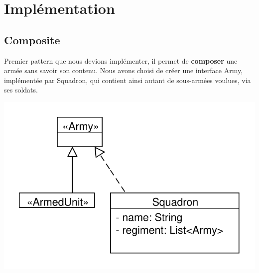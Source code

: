 ﻿\documentclass[12pt]{article}
\begin{document}
\newpage
\section{Implémentation}
\subsection{Composite}
Premier pattern que nous devions implémenter, il permet de \textbf{composer} une armée sans savoir son contenu.
Nous avons choisi de créer une interface Army, implémentée par Squadron, qui contient ainsi autant de sous-armées voulues, via ses soldats.

\includegraphics[scale=1]{../UML/Composite}
\end{document}
